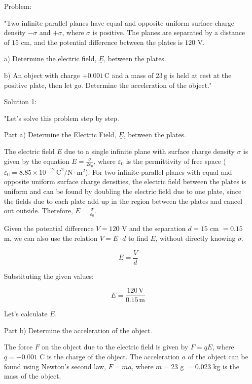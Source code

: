 Problem:

"Two infinite parallel planes have equal and opposite uniform surface charge density \( -\sigma \) and \( +\sigma \), where \( \sigma \) is positive. The planes are separated by a distance of \( 15 \) cm, and the potential difference between the plates is \( 120 \) V. 

a) Determine the electric field, \( \underline{E} \), between the plates.

b) An object with charge \( +0.001 \, \text{C} \) and a mass of \( 23 \, \text{g} \) is held at rest at the positive plate, then let go. Determine the acceleration of the object."

Solution 1: 

"Let's solve this problem step by step.

Part a) Determine the Electric Field, \( \underline{E} \), between the plates.

The electric field \( E \) due to a single infinite plane with surface charge density \( \sigma \) is given by the equation \( E = \frac{\sigma}{2\varepsilon_0} \), where \( \varepsilon_0 \) is the permittivity of free space (\( \varepsilon_0 = 8.85 \times 10^{-12} \, \text{C}^2/\text{N}\cdot\text{m}^2 \)). For two infinite parallel planes with equal and opposite uniform surface charge densities, the electric field between the plates is uniform and can be found by doubling the electric field due to one plate, since the fields due to each plate add up in the region between the plates and cancel out outside. Therefore, \( E = \frac{\sigma}{\varepsilon_0} \).

Given the potential difference \( V = 120 \) V and the separation \( d = 15 \) cm \( = 0.15 \) m, we can also use the relation \( V = E \cdot d \) to find \( E \), without directly knowing \( \sigma \).

\[ E = \frac{V}{d} \]

Substituting the given values:

\[ E = \frac{120 \, \text{V}}{0.15 \, \text{m}} \]

Let's calculate \( E \).

Part b) Determine the acceleration of the object.

The force \( F \) on the object due to the electric field is given by \( F = qE \), where \( q = +0.001 \) C is the charge of the object. The acceleration \( a \) of the object can be found using Newton's second law, \( F = ma \), where \( m = 23 \) g \( = 0.023 \) kg is the mass of the object.

